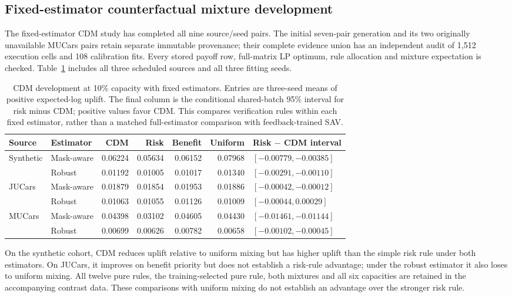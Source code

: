 \documentclass[10pt,journal]{IEEEtran}
\begin{document}
\subsection{Fixed-estimator counterfactual mixture development}
The fixed-estimator CDM study has completed all nine source/seed pairs.
The initial seven-pair generation and its two originally unavailable MUCars
pairs retain separate immutable provenance; their complete evidence union
has an independent audit of 1,512 execution cells and 108 calibration fits.
Every stored payoff row, full-matrix LP optimum, rule allocation and mixture
expectation is checked. Table~\ref{tab:cdm_development} includes all three
scheduled sources and all three fitting seeds.

\begin{table}[t]
\centering
\caption{CDM development at 10\% capacity with fixed estimators. Entries are
three-seed means of positive expected-log uplift. The final column is the
conditional shared-batch 95\% interval for risk minus CDM; positive values
favor CDM. This compares verification rules within each fixed estimator,
rather than a matched full-estimator comparison with feedback-trained SAV.}
\label{tab:cdm_development}
\begin{tabular}{llrrrrl}
\toprule
Source & Estimator & CDM & Risk & Benefit & Uniform & Risk $-$ CDM interval\\
\midrule
Synthetic & Mask-aware & 0.06224 & 0.05634 & 0.06152 & 0.07968 & $[-0.00779,-0.00385]$\\
 & Robust & 0.01192 & 0.01005 & 0.01017 & 0.01340 & $[-0.00291,-0.00110]$\\
\midrule
JUCars & Mask-aware & 0.01879 & 0.01854 & 0.01953 & 0.01886 & $[-0.00042,-0.00012]$\\
 & Robust & 0.01063 & 0.01055 & 0.01126 & 0.01009 & $[-0.00044,0.00029]$\\
\midrule
MUCars & Mask-aware & 0.04398 & 0.03102 & 0.04605 & 0.04430 & $[-0.01461,-0.01144]$\\
 & Robust & 0.00699 & 0.00626 & 0.00782 & 0.00658 & $[-0.00102,-0.00045]$\\
\bottomrule
\end{tabular}
\end{table}

On the synthetic cohort, CDM reduces uplift relative to uniform mixing but
has higher uplift than the simple risk rule under both estimators. On JUCars,
it improves on benefit priority but does not establish a risk-rule advantage;
under the robust estimator it also loses to uniform mixing. All twelve pure
rules, the training-selected pure rule, both mixtures and all six capacities
are retained in the accompanying contrast data. These comparisons with uniform mixing do not establish an advantage
over the stronger risk rule.
\end{document}
